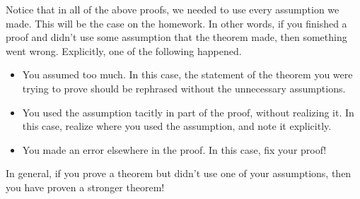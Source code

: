\documentclass[../notes.tex]{subfiles}
\begin{document}
Notice that in all of the above proofs, we needed to use every assumption we made. This will be the case on the homework. In other words, if you finished a proof and didn't use some assumption that the theorem made, then something went wrong. Explicitly, one of the following happened.
\begin{itemize}
    \item You assumed too much. In this case, the statement of the theorem you were trying to prove should be rephrased without the unnecessary assumptions.
    \item You used the assumption tacitly in part of the proof, without realizing it. In this case, realize where you used the assumption, and note it explicitly.
    \item You made an error elsewhere in the proof. In this case, fix your proof!
\end{itemize}
In general, if you prove a theorem but didn't use one of your assumptions, then you have proven a stronger theorem!
\end{document}
